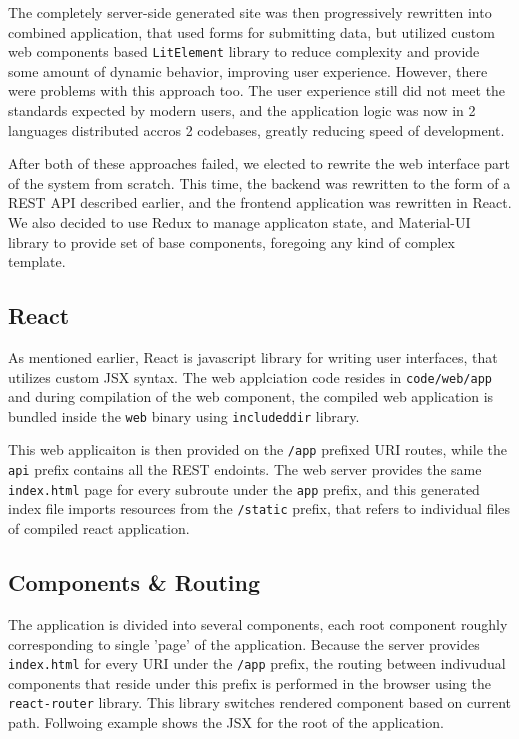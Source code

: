 The completely server-side generated site was then progressively rewritten into combined
application, that used forms for submitting data, but utilized custom web components
based \verb|LitElement| library to reduce complexity and provide some amount of dynamic behavior, improving
user experience. However, there were problems with this approach too. The user experience still did not meet the
standards expected by modern users, and the application logic was now in 2 languages distributed accros 2 codebases,
greatly reducing speed of development.

After both of these approaches failed, we elected to rewrite the web interface part of the system from scratch.
This time, the backend was rewritten to the form of a REST API described earlier, and the frontend application
was rewritten in React. We also decided to use Redux to manage applicaton state,
and Material-UI library to provide set of base components, foregoing any kind of complex template.

\subsection{React}
As mentioned earlier, React is javascript library for writing user interfaces, that utilizes custom JSX syntax.
The web applciation code resides in \verb|code/web/app| and during compilation of the web component, the
compiled web application is bundled inside the \verb|web| binary using \verb|includeddir| library.

This web applicaiton is then provided on the \verb|/app| prefixed URI routes, while the \verb|api| prefix
contains all the REST endoints. The web server provides the same \verb|index.html| page for every subroute under
the \verb|app| prefix, and this generated index file imports resources from the \verb|/static| prefix, that
refers to individual files of compiled react application.

\subsection{Components \& Routing}
The application is divided into several components, each root component roughly corresponding to single
'page' of the application. Because the server provides \verb|index.html| for every URI under the \verb|/app| prefix, the
routing between indivudual components that reside under this prefix is performed in the browser using the
\verb|react-router| library. This library switches rendered component based on current path.
Follwoing example shows the JSX for the root of the application.

